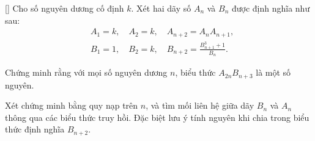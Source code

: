 \documentclass[../09-contruction-methods.tex]{subfiles}
\begin{document}
\begin{exercise*}\label{example:KOR-2015-FR-P1}[\textbf{}]
	Cho số nguyên dương cố định \( k \). Xét hai dãy số \( A_n \) và \( B_n \) được định nghĩa như sau:
	\begin{align*}
		&A_1 = k, \quad A_2 = k, \quad A_{n+2} = A_n A_{n+1}, \\
		&B_1 = 1, \quad B_2 = k, \quad B_{n+2} = \frac{B_{n+1}^3 + 1}{B_n}.
	\end{align*}
	
	Chứng minh rằng với mọi số nguyên dương \( n \), biểu thức \( A_{2n}B_{n+3} \) là một số nguyên.
\end{exercise*}

\begin{remark*}
	Xét chứng minh bằng quy nạp trên \( n \), và tìm mối liên hệ giữa dãy \( B_n \) và \( A_n \) thông qua các biểu thức truy hồi.
	Đặc biệt lưu ý tính nguyên khi chia trong biểu thức định nghĩa \( B_{n+2} \).
\end{remark*}

    
\end{document}
